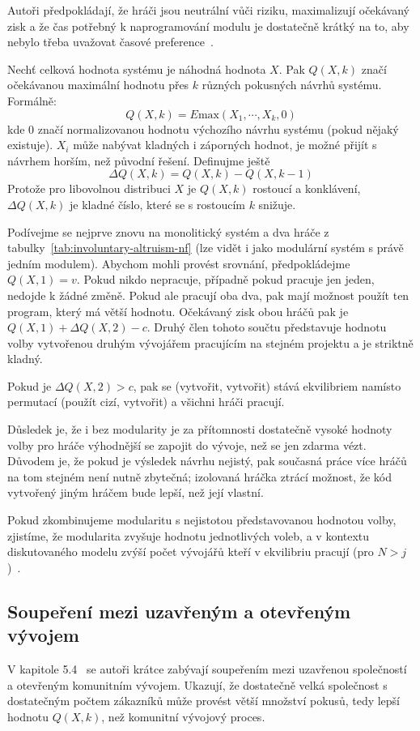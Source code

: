 \begin{multicols}{2}
		Autoři předpokládají, že hráči jsou neutrální vůči riziku, maximalizují očekávaný zisk a že čas potřebný k naprogramování modulu je dostatečně krátký na to, aby nebylo třeba uvažovat časové preference~\cite[kap. 5]{architecture-opensource}.

		Nechť celková hodnota systému je náhodná hodnota $X$. Pak $Q(X, k)$ značí očekávanou maximální hodnotu přes $k$ různých pokusných návrhů systému. Formálně:
		$$Q(X, k) = E\text{max}(X_1, \cdots, X_k, 0)$$
		kde $0$ značí normalizovanou hodnotu výchozího návrhu systému (pokud nějaký existuje). $X_i$ může nabývat kladných i záporných hodnot, je možné přijít s návrhem horším, než původní řešení. Definujme ještě
		$$\Delta Q(X, k) = Q(X,k) - Q(X, k-1)$$
		Protože pro libovolnou distribuci $X$ je $Q(X,k)$ rostoucí a konklávení, $\Delta Q(X,k)$ je kladné číslo, které se s rostoucím $k$ snižuje.

		Podívejme se nejprve znovu na monolitický systém a dva hráče z tabulky~\ref{tab:involuntary-altruism-nf} (lze vidět i jako modulární systém s právě jedním modulem). Abychom mohli provést srovnání, předpokládejme $Q(X, 1) = v$. Pokud nikdo nepracuje, případně pokud pracuje jen jeden, nedojde k žádné změně. Pokud ale pracují oba dva, pak mají možnost použít ten program, který má větší hodnotu. Očekávaný zisk obou hráčů pak je $Q(X, 1) + \Delta Q(X,2) - c$. Druhý člen tohoto součtu představuje hodnotu volby vytvořenou druhým vývojářem pracujícím na stejném projektu a je striktně kladný.

		Pokud je $\Delta Q(X,2) > c$, pak se (vytvořit, vytvořit) stává ekvilibriem namísto permutací (použít cizí, vytvořit) a všichni hráči pracují.

		Důsledek je, že i bez modularity je za přítomnosti dostatečně vysoké hodnoty volby pro hráče výhodnější se zapojit do vývoje, než se jen zdarma vézt. Důvodem je, že pokud je výsledek návrhu nejistý, pak současná práce více hráčů na tom stejném není nutně zbytečná; izolovaná hráčka ztrácí možnost, že kód vytvořený jiným hráčem bude lepší, než její vlastní.

		Pokud zkombinujeme modularitu s nejistotou představovanou hodnotou volby, zjistíme, že modularita zvyšuje hodnotu jednotlivých voleb, a v kontextu diskutovaného modelu zvýší počet vývojářů kteří v ekvilibriu pracují (pro $N > j$)~\cite[kap. 5.2 a 5.3]{architecture-opensource}.

	\subsection*{Soupeření mezi uzavřeným a otevřeným vývojem}
		V kapitole 5.4~\cite{architecture-opensource} se autoři krátce zabývají soupeřením mezi uzavřenou společností a otevřeným komunitním vývojem. Ukazují, že dostatečně velká společnost s dostatečným počtem zákazníků může provést větší množství pokusů, tedy lepší hodnotu $Q(X,k)$, než komunitní vývojový proces.


\end{multicols}
